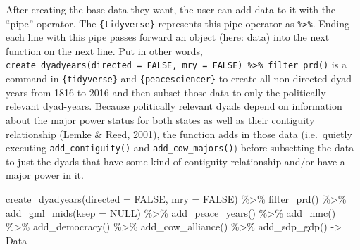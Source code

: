 \documentclass[
  11pt,
]{article}
\newenvironment{Shaded}{\begin{snugshade}}{\end{snugshade}}
\newcommand{\AttributeTok}[1]{\textcolor[rgb]{0.77,0.63,0.00}{#1}}
\newcommand{\ConstantTok}[1]{\textcolor[rgb]{0.00,0.00,0.00}{#1}}
\newcommand{\FunctionTok}[1]{\textcolor[rgb]{0.00,0.00,0.00}{#1}}
\newcommand{\NormalTok}[1]{#1}
\newcommand{\OtherTok}[1]{\textcolor[rgb]{0.56,0.35,0.01}{#1}}
\newcommand{\SpecialCharTok}[1]{\textcolor[rgb]{0.00,0.00,0.00}{#1}}
\begin{document}
After creating the base data they want, the user can add data to it with the ``pipe'' operator. The \texttt{\{tidyverse\}} represents this pipe operator as \texttt{\%\textgreater{}\%}. Ending each line with this pipe passes forward an object (here: data) into the next function on the next line. Put in other words, \texttt{create\_dyadyears(directed\ =\ FALSE,\ mry\ =\ FALSE)\ \%\textgreater{}\%\ filter\_prd()} is a command in \texttt{\{tidyverse\}} and \texttt{\{peacesciencer\}} to create all non-directed dyad-years from 1816 to 2016 and then subset those data to only the politically relevant dyad-years. Because politically relevant dyads depend on information about the major power status for both states as well as their contiguity relationship (Lemke \& Reed, 2001), the function adds in those data (i.e.~quietly executing \texttt{add\_contiguity()} and \texttt{add\_cow\_majors()}) before subsetting the data to just the dyads that have some kind of contiguity relationship and/or have a major power in it.

\begin{Shaded}
\begin{Highlighting}[]
\FunctionTok{create\_dyadyears}\NormalTok{(}\AttributeTok{directed =} \ConstantTok{FALSE}\NormalTok{, }\AttributeTok{mry =} \ConstantTok{FALSE}\NormalTok{) }\SpecialCharTok{\%\textgreater{}\%}
  \FunctionTok{filter\_prd}\NormalTok{() }\SpecialCharTok{\%\textgreater{}\%}
  \FunctionTok{add\_gml\_mids}\NormalTok{(}\AttributeTok{keep =} \ConstantTok{NULL}\NormalTok{) }\SpecialCharTok{\%\textgreater{}\%}
  \FunctionTok{add\_peace\_years}\NormalTok{() }\SpecialCharTok{\%\textgreater{}\%}
  \FunctionTok{add\_nmc}\NormalTok{() }\SpecialCharTok{\%\textgreater{}\%}
  \FunctionTok{add\_democracy}\NormalTok{() }\SpecialCharTok{\%\textgreater{}\%}
  \FunctionTok{add\_cow\_alliance}\NormalTok{() }\SpecialCharTok{\%\textgreater{}\%}
  \FunctionTok{add\_sdp\_gdp}\NormalTok{() }\OtherTok{{-}\textgreater{}}\NormalTok{ Data}
\end{Highlighting}
\end{Shaded}
\end{document}
